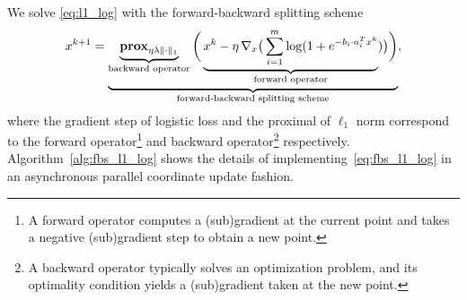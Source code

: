 We solve \eqref{eq:l1_log} with the forward-backward splitting scheme
\begin{equation}\label{eq:fbs_l1_log}
  x^{k+1} = \underbrace{\underbrace{\mathbf{prox}_{ \eta \lambda \|\cdot\|_1}}_{\text{backward operator}}
  \bigg(\underbrace{x^k - \eta \, \nabla_{x} \big(\sum_{i = 1}^m \log (1 + e^{-b_i \cdot a_i^T x^k}}_{\text{forward operator}})\big)\bigg)}_{\text{forward-backward splitting scheme}},
\end{equation}
where the gradient step of logistic loss and the proximal of $\ell_1$ norm correspond to the
forward operator\footnote{A forward operator computes a (sub)gradient at the current point and takes a negative (sub)gradient step to obtain a new point.} and backward operator\footnote{A backward operator typically solves an optimization problem, and its optimality condition yields a (sub)gradient taken at the new point.} respectively. Algorithm~\ref{alg:fbs_l1_log} shows the details of
implementing~\eqref{eq:fbs_l1_log} in an asynchronous parallel coordinate update fashion.

